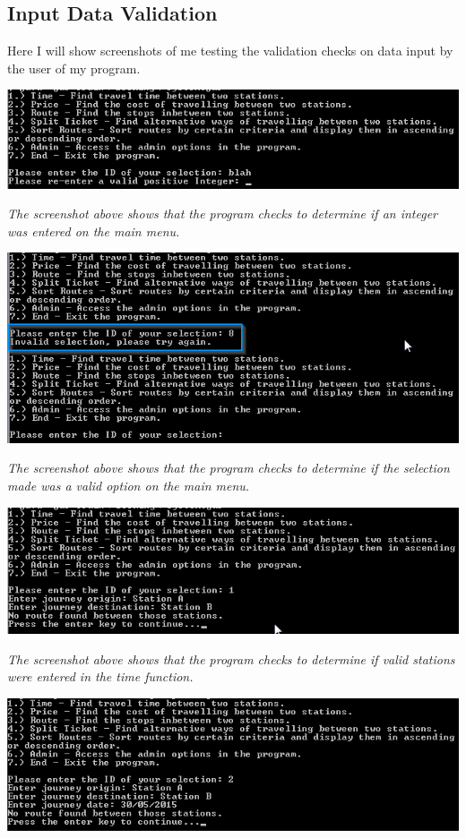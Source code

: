 \documentclass[10pt, a4paper]{article}
\begin{document}
\subsection{Input Data Validation}
Here I will show screenshots of me testing the validation checks on data input by the user of my program.

\includegraphics{Validation1.png}

\textit{The screenshot above shows that the program checks to determine if an integer was entered on the main menu.}

\includegraphics{Validation2.png}

\textit{The screenshot above shows that the program checks to determine if the selection made was a valid option on the main menu.}

\includegraphics{Validation3.png}

\textit{The screenshot above shows that the program checks to determine if valid stations were entered in the time function.}

\includegraphics{Validation4.png}
\end{document}
